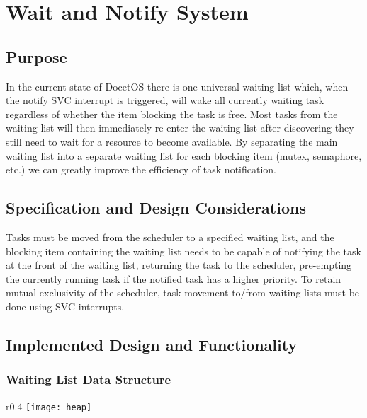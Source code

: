 \section{Wait and Notify System}
\subsection{Purpose}
In the current state of DocetOS there is one universal waiting list which, when the notify SVC interrupt is triggered, will wake all currently waiting task regardless of whether the item blocking the task is free. Most tasks from the waiting list will then immediately re-enter the waiting list after discovering they still need to wait for a resource to become available. By separating the main waiting list into a separate waiting list for each blocking item (mutex, semaphore, etc.) we can greatly improve the efficiency of task notification.

\subsection{Specification and Design Considerations}
Tasks must be moved from the scheduler to a specified waiting list, and the blocking item containing the waiting list needs to be capable of notifying the task at the front of the waiting list, returning the task to the scheduler, pre-empting the currently running task if the notified task has a higher priority. To retain mutual exclusivity of the scheduler, task movement to/from waiting lists must be done using SVC interrupts.

\subsection{Implemented Design and Functionality}
\subsubsection{Waiting List Data Structure}

\begin{wrapfigure}{r}{0.4\textwidth}
	\centering
	\vspace{-\baselineskip}
	\texttt{[image: heap]}
\end{wrapfigure}


